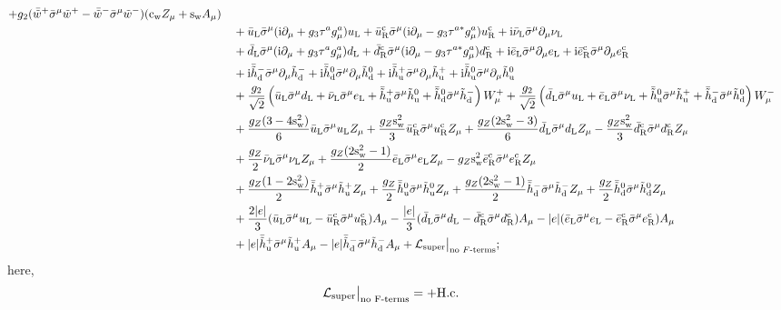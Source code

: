 \documentclass[CheatSheet]{subfiles}
\begin{document}
\begin{align}
\begin{split}
 + g_2(\bar{\tiw}^{+}\bsigma^\mu\tiw^{+} - \bar{\tiw}^{-}\bsigma^\mu\tiw^{-})(\co{\mathrm w}Z_{\mu} + \si{\mathrm w}A_{\mu})
\\&\quad
 + \buL\bsigma^\mu(\ii\partial_{\mu} + g_3\tau^ag_{\mu}^{a})\uL
 + \buR^{\cc}\bsigma^\mu(\ii\partial_{\mu} - g_3\tau^{a*} g_{\mu}^{a})\uR^{\cc}
 + {\ii} \bnuL\bsigma^\mu\partial_{\mu}\nuL
\\&\quad
 + \bdL\bsigma^\mu(\ii\partial_{\mu} + g_3\tau^ag_{\mu}^{a})\dL
 + \bdR^{\cc}\bsigma^\mu(\ii\partial_{\mu} - g_3\tau^{a*} g_{\mu}^{a})\dR^{\cc}
 + {\ii} \beL\bsigma^\mu\partial_{\mu}\eL
 + {\ii} \beR^{\cc }\bsigma^\mu\partial_{\mu}\eR^{\cc }
\\&\quad
 + {\ii} \bthdm\bsigma^\mu\partial_{\mu}\thdm
 + {\ii} \bthdz\bsigma^\mu\partial_{\mu}\thdz
 + {\ii} \bthup\bsigma^\mu\partial_{\mu}\thup
 + {\ii} \bthuz\bsigma^\mu\partial_{\mu}\thuz
\\&\quad
 + \frac{g_2}{\sqrt2} \left(\buL\bsigma^\mu\dL
 + \bnuL\bsigma^\mu\eL
 + \bthup\bsigma^\mu\thuz
 + \bthdz\bsigma^\mu\thdm\right) W_{\mu}^{+}
 + \frac{g_2}{\sqrt2} \left(\bdL\bsigma^\mu\uL
 + \beL\bsigma^\mu\nuL
 + \bthuz\bsigma^\mu\thup
 + \bthdm\bsigma^\mu\thdz\right) W_{\mu}^{-}
\\&\quad
+ \frac{g_Z(3-4\sisi{\mathrm w})}{6}\buL\bsigma^\mu\uL Z_{\mu}
 + \frac{g_Z\sisi{\mathrm w}}{3}\buR^{\cc}\bsigma^\mu\uR^{\cc}Z_{\mu}
+ \frac{g_Z(2\sisi{\mathrm w}-3)}{6}\bdL\bsigma^\mu\dL Z_{\mu}
 - \frac{g_Z\sisi{\mathrm w}}{3}\bdR^{\cc}\bsigma^\mu\dR^{\cc}Z_{\mu}
\\&\quad
+ \frac{g_Z}{2} \bnuL\bsigma^\mu\nuL Z_{\mu}
+ \frac{g_Z(2\sisi{\mathrm w}-1)}{2} \beL\bsigma^\mu\eL Z_{\mu}
 - g_Z\sisi{\mathrm w}\beR^{\cc }\bsigma^\mu\eR^{\cc }Z_{\mu}
\\&\quad
+ \frac{g_Z(1-2\sisi{\mathrm w})}{2}\bthup\bsigma^\mu\thup Z_{\mu}
+ \frac{g_Z}{2} \bthuz\bsigma^\mu\thuz Z_{\mu}
+ \frac{g_Z(2\sisi{\mathrm w} - 1)}{2} \bthdm\bsigma^\mu\thdm Z_{\mu}
+ \frac{g_Z}{2}\bthdz\bsigma^\mu\thdz Z_{\mu}
\\&\quad
 + \frac{2|e|}{3}(\buL\bsigma^\mu\uL - \buR^{\cc}\bsigma^\mu\uR^{\cc})A_{\mu}
 - \frac{|e|}{3}(\bdL\bsigma^\mu\dL - \bdR^{\cc}\bsigma^\mu\dR^{\cc})A_{\mu}
 - |e|(\beL\bsigma^\mu\eL-\beR^{\cc }\bsigma^\mu\eR^{\cc }) A_{\mu}
\\&\quad
 + |e|\bthup\bsigma^\mu\thup A_{\mu}
 - |e|\bthdm\bsigma^\mu\thdm A_{\mu}
 + \mathcal L\w{super}\big|_{\text{no $F$-terms}};
 \end{split}
\end{align}
here,
\begin{equation}
\begin{split}
  \mathcal L\w{super}\big|_{\text{no F-terms}}&=
  + \text{H.c.}
\end{split}
\end{equation}
\end{document}
